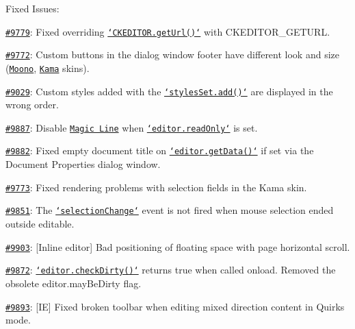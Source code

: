 Fixed Issues\-:
\begin{DoxyItemize}
\item \href{http://dev.ckeditor.com/ticket/9779}{\tt \#9779}\-: Fixed overriding \href{http://docs.ckeditor.com/#!/api/CKEDITOR-method-getUrl}{\tt `\-C\-K\-E\-D\-I\-T\-O\-R.get\-Url()`} with {\ttfamily C\-K\-E\-D\-I\-T\-O\-R\-\_\-\-G\-E\-T\-U\-R\-L}.
\item \href{http://dev.ckeditor.com/ticket/9772}{\tt \#9772}\-: Custom buttons in the dialog window footer have different look and size (\href{http://ckeditor.com/addon/moono}{\tt Moono}, \href{http://ckeditor.com/addon/kama}{\tt Kama} skins).
\item \href{http://dev.ckeditor.com/ticket/9029}{\tt \#9029}\-: Custom styles added with the \href{http://docs.ckeditor.com/#!/api/CKEDITOR.stylesSet-method-add}{\tt `styles\-Set.add()`} are displayed in the wrong order.
\item \href{http://dev.ckeditor.com/ticket/9887}{\tt \#9887}\-: Disable \href{http://ckeditor.com/addon/magicline}{\tt Magic Line} when \href{http://docs.ckeditor.com/#!/api/CKEDITOR.editor-property-readOnly}{\tt `editor.read\-Only`} is set.
\item \href{http://dev.ckeditor.com/ticket/9882}{\tt \#9882}\-: Fixed empty document title on \href{http://docs.ckeditor.com/#!/api/CKEDITOR.editor-method-getData}{\tt `editor.get\-Data()`} if set via the Document Properties dialog window.
\item \href{http://dev.ckeditor.com/ticket/9773}{\tt \#9773}\-: Fixed rendering problems with selection fields in the Kama skin.
\item \href{http://dev.ckeditor.com/ticket/9851}{\tt \#9851}\-: The \href{http://docs.ckeditor.com/#!/api/CKEDITOR.editor-event-selectionChange}{\tt `selection\-Change`} event is not fired when mouse selection ended outside editable.
\item \href{http://dev.ckeditor.com/ticket/9903}{\tt \#9903}\-: \mbox{[}Inline editor\mbox{]} Bad positioning of floating space with page horizontal scroll.
\item \href{http://dev.ckeditor.com/ticket/9872}{\tt \#9872}\-: \href{http://docs.ckeditor.com/#!/api/CKEDITOR.editor-method-checkDirty}{\tt `editor.check\-Dirty()`} returns {\ttfamily true} when called onload. Removed the obsolete {\ttfamily editor.\-may\-Be\-Dirty} flag.
\item \href{http://dev.ckeditor.com/ticket/9893}{\tt \#9893}\-: \mbox{[}I\-E\mbox{]} Fixed broken toolbar when editing mixed direction content in Quirks mode.

\end{DoxyItemize}
